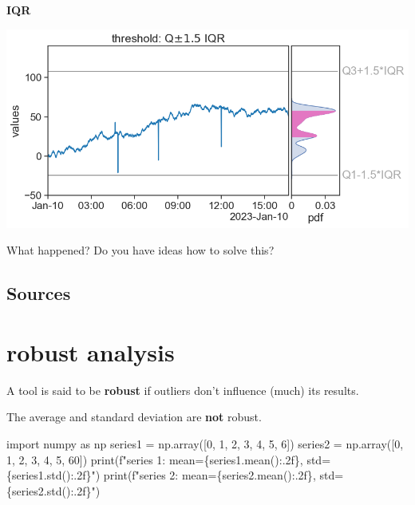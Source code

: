 \documentclass[
  letterpaper,
  DIV=11,
  numbers=noendperiod,
  oneside]{scrreprt}
\newenvironment{Shaded}{\begin{snugshade}}{\end{snugshade}}
\newcommand{\BuiltInTok}[1]{\textcolor[rgb]{0.00,0.23,0.31}{#1}}
\newcommand{\DecValTok}[1]{\textcolor[rgb]{0.68,0.00,0.00}{#1}}
\newcommand{\ImportTok}[1]{\textcolor[rgb]{0.00,0.46,0.62}{#1}}
\newcommand{\NormalTok}[1]{\textcolor[rgb]{0.00,0.23,0.31}{#1}}
\newcommand{\OperatorTok}[1]{\textcolor[rgb]{0.37,0.37,0.37}{#1}}
\newcommand{\SpecialCharTok}[1]{\textcolor[rgb]{0.37,0.37,0.37}{#1}}
\newcommand{\SpecialStringTok}[1]{\textcolor[rgb]{0.13,0.47,0.30}{#1}}
\begin{document}
\textbf{IQR}

\includegraphics{outliers/outliers_1.5IQR_seed40.png}

What happened? Do you have ideas how to solve this?

\hypertarget{sources}{%
\section{Sources}\label{sources}}

\hypertarget{robust-analysis}{%
\chapter{robust analysis}\label{robust-analysis}}

A tool is said to be \textbf{robust} if outliers don't influence (much)
its results.

The average and standard deviation are \textbf{not} robust.

\begin{Shaded}
\begin{Highlighting}[]
\ImportTok{import}\NormalTok{ numpy }\ImportTok{as}\NormalTok{ np}
\NormalTok{series1 }\OperatorTok{=}\NormalTok{ np.array([}\DecValTok{0}\NormalTok{, }\DecValTok{1}\NormalTok{, }\DecValTok{2}\NormalTok{, }\DecValTok{3}\NormalTok{, }\DecValTok{4}\NormalTok{, }\DecValTok{5}\NormalTok{, }\DecValTok{6}\NormalTok{])}
\NormalTok{series2 }\OperatorTok{=}\NormalTok{ np.array([}\DecValTok{0}\NormalTok{, }\DecValTok{1}\NormalTok{, }\DecValTok{2}\NormalTok{, }\DecValTok{3}\NormalTok{, }\DecValTok{4}\NormalTok{, }\DecValTok{5}\NormalTok{, }\DecValTok{60}\NormalTok{])}
\BuiltInTok{print}\NormalTok{(}\SpecialStringTok{f"series 1: mean=}\SpecialCharTok{\{}\NormalTok{series1}\SpecialCharTok{.}\NormalTok{mean()}\SpecialCharTok{:.2f\}}\SpecialStringTok{, std=}\SpecialCharTok{\{}\NormalTok{series1}\SpecialCharTok{.}\NormalTok{std()}\SpecialCharTok{:.2f\}}\SpecialStringTok{"}\NormalTok{)}
\BuiltInTok{print}\NormalTok{(}\SpecialStringTok{f"series 2: mean=}\SpecialCharTok{\{}\NormalTok{series2}\SpecialCharTok{.}\NormalTok{mean()}\SpecialCharTok{:.2f\}}\SpecialStringTok{, std=}\SpecialCharTok{\{}\NormalTok{series2}\SpecialCharTok{.}\NormalTok{std()}\SpecialCharTok{:.2f\}}\SpecialStringTok{"}\NormalTok{)}
\end{Highlighting}
\end{Shaded}
\end{document}
